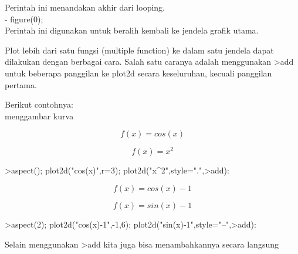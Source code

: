 \documentclass[a4paper,10pt]{article}
\begin{document}
\begin{eulernotebook}
\begin{eulercomment}
\begin{eulercomment}
\begin{eulercomment}
\begin{eulercomment}
\begin{eulercomment}
\begin{eulercomment}
\begin{eulercomment}
Perintah ini menandakan akhir dari looping.\\
- figure(0);\\
Perintah ini digunakan untuk beralih kembali ke jendela grafik utama.
\end{eulercomment}
\begin{eulercomment}
Plot lebih dari satu fungsi (multiple function) ke dalam satu jendela
dapat dilakukan dengan berbagai cara. Salah satu caranya adalah
menggunakan \textgreater{}add untuk beberapa panggilan ke plot2d secara
keseluruhan, kecuali panggilan pertama.

Berikut contohnya:\\
menggambar kurva\\
\end{eulercomment}
\begin{eulerformula}
\[
 f(x)=cos(x)
\]
\end{eulerformula}
\begin{eulerformula}
\[
f(x)= x^2
\]
\end{eulerformula}
\begin{eulerprompt}
>aspect(); plot2d("cos(x)",r=3); plot2d("x^2",style=".",>add):
\end{eulerprompt}
\begin{eulerformula}
\[
f(x)=cos(x)-1
\]
\end{eulerformula}
\begin{eulerformula}
\[
f(x)= sin(x)-1
\]
\end{eulerformula}
\begin{eulerprompt}
>aspect(2); plot2d("cos(x)-1",-1,6); plot2d("sin(x)-1",style="--",>add):
\end{eulerprompt}
\begin{eulercomment}
Selain menggunakan \textgreater{}add kita juga bisa menambahkannya secara langsung


\end{eulercomment}
\end{eulercomment}
\end{eulercomment}
\end{eulercomment}
\end{eulercomment}
\end{eulercomment}
\end{eulercomment}
\end{eulernotebook}
\end{document}

